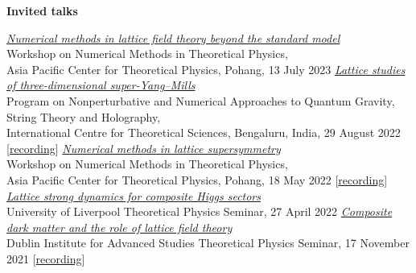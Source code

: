 \renewenvironment{spacelist} {
  \begin{list} {} {
    \setlength{\topsep}{-8 pt}
    \setlength{\itemsep}{5 pt}
    \setlength{\leftmargin}{-1.15 in}
  }
}{
  \end{list}
}

\raggedright
\vspace{12 pt}
\begin{spacelist}
  \item {\large \bfseries Invited talks}
  \begin{revnumerate}
  \setlength{\topsep}{-8 pt}
  \setlength{\itemsep}{10 pt}
  \setlength{\leftmargin}{0 mm}
    \pagebreakitem
      \textit{\href{http://www.davidschaich.net/talks/2307APCTP.pdf}{Numerical methods in lattice field theory beyond the standard model}} \\
      Workshop on Numerical Methods in Theoretical Physics, \\ Asia Pacific Center for Theoretical Physics, Pohang, 13 July 2023
    \pagebreakitem
      \textit{\href{http://www.davidschaich.net/talks/2208Bangalore.pdf}{Lattice studies of three-dimensional super-Yang--Mills}} \\
      Program on Nonperturbative and Numerical Approaches to Quantum Gravity, String Theory and Holography, \\ International Centre for Theoretical Sciences, Bengaluru, India, 29 August 2022 [\href{https://www.youtube.com/watch?v=dwWu-u0H2o0&t=3115s}{recording}]
    \pagebreakitem
      \textit{\href{http://www.davidschaich.net/talks/2205APCTP.pdf}{Numerical methods in lattice supersymmetry}} \\
      Workshop on Numerical Methods in Theoretical Physics, \\ Asia Pacific Center for Theoretical Physics, Pohang, 18 May 2022 [\href{https://www.youtube.com/watch?v=lPPfAwNlxzw}{recording}]
    \pagebreakitem
      \textit{\href{http://www.davidschaich.net/talks/2204Liverpool.pdf}{Lattice strong dynamics for composite Higgs sectors}} \\
      University of Liverpool Theoretical Physics Seminar, 27 April 2022
    \pagebreakitem
      \textit{\href{http://www.davidschaich.net/talks/2111Dublin.pdf}{Composite dark matter and the role of lattice field theory}} \\
      Dublin Institute for Advanced Studies Theoretical Physics Seminar, 17 November 2021 [\href{https://www.youtube.com/watch?v=WdKbw142Oyg}{recording}]

\end{revnumerate}
\end{spacelist}

